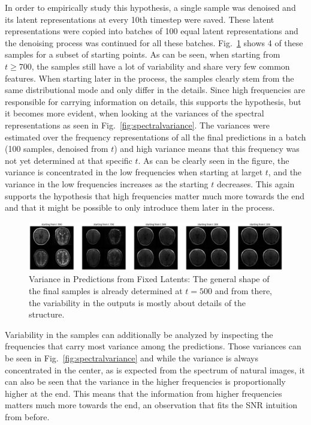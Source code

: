 In order to empirically study this hypothesis, a single sample was denoised and its latent representations at every 10th timestep were saved. These latent representations were copied into batches of 100 equal latent representations and the denoising process was continued for all these batches. Fig.~\ref{fig:predvariance} shows 4 of these samples for a subset of starting points. As can be seen, when starting from $t\geq700$, the samples still have a lot of variability and share very few common features. When starting later in the process, the samples clearly stem from the same distributional mode and only differ in the details. Since high frequencies are responsible for carrying information on details, this supports the hypothesis, but it becomes more evident, when looking at the variances of the spectral representations as seen in Fig.~\ref{fig:spectralvariance}. The variances were estimated over the frequency representations of all the final predictions in a batch (100 samples, denoised from $t$) and high variance means that this frequency was not yet determined at that specific $t$. As can be clearly seen in the figure, the variance is concentrated in the low frequencies when starting at larget $t$, and the variance in the low frequencies increases as the starting $t$ decreases. This again supports the hypothesis that high frequencies matter much more towards the end and that it might be possible to only introduce them later in the process.
\begin{figure}[h]
    \centering
    \includegraphics[width=.75\textwidth]{images/fixedlatents_variance.png}
    \caption[Variance in Predictions from Fixed Latents]{Variance in Predictions from Fixed Latents: The general shape of the final samples is already determined at $t=500$ and from there, the variability in the outputs is mostly about details of the structure.}
    \label{fig:predvariance}
\end{figure}
Variability in the samples can additionally be analyzed by inspecting the frequencies that carry most variance among the predictions. Those variances can be seen in Fig.~\ref{fig:spectralvariance} and while the variance is always concentrated in the center, as is expected from the spectrum of natural images, it can also be seen that the variance in the higher frequencies is proportionally higher at the end. This means that the information from higher frequencies matters much more towards the end, an observation that fits the SNR intuition from before.

